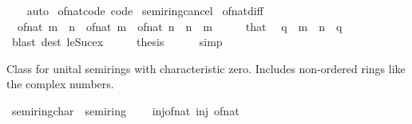 \begin{isabellebody}
%
\isadelimproof
\ \ %
\endisadelimproof
%
\isatagproof
{}\isamarkupfalse%
\ auto%
\endisatagproof
{\isafoldproof}%
%
\isadelimproof
\isanewline
%
\endisadelimproof
\isanewline
{}\isamarkupfalse%
\isanewline
\isanewline
{}\isamarkupfalse%
\ of{\isacharunderscore}{\kern0pt}nat{\isacharunderscore}{\kern0pt}code\ {\isacharbrackleft}{\kern0pt}code{\isacharbrackright}{\kern0pt}\isanewline
\isanewline
{}\isamarkupfalse%
\ semiring{\isacharunderscore}{\kern0pt}{}{\isacharunderscore}{\kern0pt}cancel\isanewline
{}\isanewline
\isanewline
{}\isamarkupfalse%
\ of{\isacharunderscore}{\kern0pt}nat{\isacharunderscore}{\kern0pt}diff{\isacharcolon}{\kern0pt}\isanewline
\ \ {\isacartoucheopen}of{\isacharunderscore}{\kern0pt}nat\ {\isacharparenleft}{\kern0pt}m\ {\isacharminus}{\kern0pt}\ n{\isacharparenright}{\kern0pt}\ {\isacharequal}{\kern0pt}\ of{\isacharunderscore}{\kern0pt}nat\ m\ {\isacharminus}{\kern0pt}\ of{\isacharunderscore}{\kern0pt}nat\ n{\isacartoucheclose}\ \ {\isacartoucheopen}n\ {\isasymle}\ m{\isacartoucheclose}\isanewline
%
\isadelimproof
%
\endisadelimproof
%
\isatagproof
{}\isamarkupfalse%
\ {\isacharminus}{\kern0pt}\isanewline
\ \ \isamarkupfalse%
\ that\ \isamarkupfalse%
\ q\ \ {\isacartoucheopen}m\ {\isacharequal}{\kern0pt}\ n\ {\isacharplus}{\kern0pt}\ q{\isacartoucheclose}\isanewline
\ \ \ \ \isamarkupfalse%
\ {\isacharparenleft}{\kern0pt}blast\ dest{\isacharcolon}{\kern0pt}\ le{\isacharunderscore}{\kern0pt}Suc{\isacharunderscore}{\kern0pt}ex{\isacharparenright}{\kern0pt}\isanewline
\ \ \isamarkupfalse%
\ \isamarkupfalse%
\ {\isacharquery}{\kern0pt}thesis\isanewline
\ \ \ \ \isamarkupfalse%
\ simp\isanewline
{}\isamarkupfalse%
%
\endisatagproof
{\isafoldproof}%
%
\isadelimproof
\isanewline
%
\endisadelimproof
\isanewline
{}\isamarkupfalse%
%
\begin{isamarkuptext}%
Class for unital semirings with characteristic zero.
 Includes non-ordered rings like the complex numbers.%
\end{isamarkuptext}\isamarkuptrue%
\isamarkupfalse%
\ semiring{\isacharunderscore}{\kern0pt}char{\isacharunderscore}{\kern0pt}{}\ {\isacharequal}{\kern0pt}\ semiring{\isacharunderscore}{\kern0pt}{}\ {\isacharplus}{\kern0pt}\isanewline
\ \ \ inj{\isacharunderscore}{\kern0pt}of{\isacharunderscore}{\kern0pt}nat{\isacharcolon}{\kern0pt}\ {\isachardoublequoteopen}inj\ of{\isacharunderscore}{\kern0pt}nat{\isachardoublequoteclose}\isanewline

\end{isabellebody}
